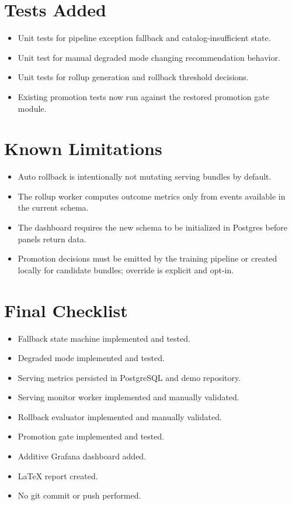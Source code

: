 \documentclass[11pt]{article}
\begin{document}
\section*{Tests Added}
\begin{itemize}[leftmargin=*]
  \item Unit tests for pipeline exception fallback and catalog-insufficient state.
  \item Unit test for manual degraded mode changing recommendation behavior.
  \item Unit tests for rollup generation and rollback threshold decisions.
  \item Existing promotion tests now run against the restored promotion gate module.
\end{itemize}

\section*{Known Limitations}
\begin{itemize}[leftmargin=*]
  \item Auto rollback is intentionally not mutating serving bundles by default.
  \item The rollup worker computes outcome metrics only from events available in the current schema.
  \item The dashboard requires the new schema to be initialized in Postgres before panels return data.
  \item Promotion decisions must be emitted by the training pipeline or created locally for candidate bundles; override is explicit and opt-in.
\end{itemize}

\section*{Final Checklist}
\begin{itemize}[leftmargin=*]
  \item Fallback state machine implemented and tested.
  \item Degraded mode implemented and tested.
  \item Serving metrics persisted in PostgreSQL and demo repository.
  \item Serving monitor worker implemented and manually validated.
  \item Rollback evaluator implemented and manually validated.
  \item Promotion gate implemented and tested.
  \item Additive Grafana dashboard added.
  \item LaTeX report created.
  \item No git commit or push performed.
\end{itemize}
\end{document}
